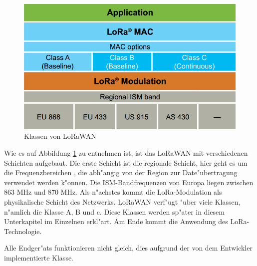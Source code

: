\begin{figure}[h]
	\centering
	\includegraphics[width=14cm]{source/images/LoRa_MAC}
	\caption{Klassen von LoRaWAN \cite{LoRaWAN}\label{fig:LoRaMAC}}
\end{figure}

Wie es auf Abbildung \ref{fig:LoRaMAC} zu entnehmen ist, ist das LoRaWAN mit verschiedenen Schichten aufgebaut. Die erste Schicht ist die regionale Schicht, hier geht es um die Frequenzbereichen , die abh"angig von der Region zur Date"ubertragung verwendet werden k"onnen. Die ISM-Bandfrequenzen von Europa liegen zwischen 863 MHz und 870 MHz.
Als n"achstes kommt die LoRa-Modulation als physikalische Schicht des Netzwerks. LoRaWAN verf"ugt "uber viele Klassen, n"amlich die Klasse A, B und c. Diese Klassen werden sp"ater in diesem Unterkapitel im Einzelnen erkl"art. Am Ende kommt die Anwendung des LoRa-Technologie.

Alle Endger"ats funktionieren nicht gleich, dies aufgrund der von dem Entwickler implementierte Klasse.

